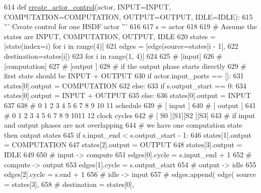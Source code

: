\begin{DoxyCode}
614     \textcolor{keyword}{def }\hyperlink{namespacesylva_1_1glic_1_1glic_ae31a233cafcb3a83bd369c491b133b91}{create\_actor\_control}(actor, INPUT=INPUT, COMPUTATION=COMPUTATION, 
      OUTPUT=OUTPUT, IDLE=IDLE):
615         \textcolor{stringliteral}{''' Create control for one HSDF actor '''}
616 
617         s = actor
618 
619         \textcolor{comment}{# Assume the states are INPUT, COMPUTATION, OUTPUT, IDLE}
620         states = [state(index=i) \textcolor{keywordflow}{for} i \textcolor{keywordflow}{in} range(4)]
621         edges = [edge(source=states[i - 1],
622                       destination=states[i])
623                  \textcolor{keywordflow}{for} i \textcolor{keywordflow}{in} range(1, 4)]
624 
625         \textcolor{comment}{# [input]}
626         \textcolor{comment}{# [computation]}
627         \textcolor{comment}{# [output     ]}
628         \textcolor{comment}{# if the output phase starts directly}
629         \textcolor{comment}{# first state should be INPUT + OUTPUT}
630         \textcolor{keywordflow}{if} actor.input\_ports == []:
631             states[0].output = COMPUTATION
632         \textcolor{keywordflow}{else}:
633             \textcolor{keywordflow}{if} s.output\_start == 0:
634                 states[0].output = INPUT + OUTPUT
635             \textcolor{keywordflow}{else}:
636                 states[0].output = INPUT
637 
638         \textcolor{comment}{#   0 1 2 3 4 5 6 7 8 9 10 11 schedule}
639         \textcolor{comment}{#   [ input  ]}
640         \textcolor{comment}{#                 [ output ]}
641         \textcolor{comment}{# 0 1 2 3 4 5 6 7 8 9 1011 12 clock cycles}
642         \textcolor{comment}{#   [ S0     ][S1][S2      ][S3]}
643         \textcolor{comment}{# if input and output phases are not overlapping}
644         \textcolor{comment}{# we have one computation state then output states}
645         \textcolor{keywordflow}{if} s.input\_end < s.output\_start - 1:
646             states[1].output = COMPUTATION
647             states[2].output = OUTPUT
648             states[3].output = IDLE
649 
650             \textcolor{comment}{# input -> compute}
651             edges[0].cycle = s.input\_end + 1
652             \textcolor{comment}{# compute -> output}
653             edges[1].cycle = s.output\_start
654             \textcolor{comment}{# output -> idle}
655             edges[2].cycle = s.end + 1
656             \textcolor{comment}{# idle -> input}
657             \textcolor{comment}{# edges.append( edge( source = states[3],}
658             \textcolor{comment}{#                     destination = states[0],}

\end{DoxyCode}
